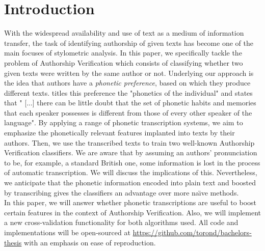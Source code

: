 \chapter{Introduction}\label{introduction}
With the widespread availability and use of text as a medium of information transfer, the task of identifying authorship of given texts has become one of the main focuses of stylometric analysis.
In this paper, we specifically tackle the problem of Authorship Verification which consists of classifying whether two given texts were written by the same author or not.
Underlying our approach is the idea that authors have a \textit{phonetic preference}, based on which they produce different texts.
\cite{ladefoged2014courseInPhonetics} titles this preference the "phonetics of the individual" and states that " [...] there can be little doubt that the set of phonetic habits and memories that each speaker possesses is different from those of every other speaker of the language".
By applying a range of phonetic transcription systems, we aim to emphasize the phonetically relevant features implanted into texts by their authors.
Then, we use the transcribed texts to train two well-known Authorship Verification classifiers.
We are aware that by assuming an authors' pronunciation to be, for example, a standard British one, some information is lost in the process of automatic transcription.
We will discuss the implications of this.
Nevertheless, we anticipate that the phonetic information encoded into plain text and boosted by transcribing gives the classifiers an advantage over more na\"{\i}ve methods.\\
In this paper, we will answer whether phonetic transcriptions are useful to boost certain features in the context of Authorship Verification.
Also, we will implement a new cross-validation functionality for both algorithms used.
All code and implementations will be open-sourced at \url{https://github.com/torond/bachelors-thesis} with an emphasis on ease of reproduction.










